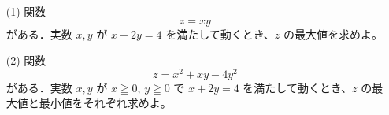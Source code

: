 \documentclass[8pt,dvipdfmx]{article}
\begin{document}
\begin{tcolorbox}[title=数学\textcircled{1} 1-5 BC]
\begin{enumerate}
    \item[(1)] 関数 \[ z = xy \] がある．実数 \(x, y\) が \(x + 2y = 4\) を満たして動くとき、\(z\) の最大値を求めよ。
    \vspace{2mm} %

    \item[(2)] 関数 \[ z = x^2 + xy - 4y^2 \] がある．実数 \(x, y\) が \(x \geqq 0\), \(y \geqq 0\) で \(x + 2y = 4\) を満たして動くとき、\(z\) の最大値と最小値をそれぞれ求めよ。
\end{enumerate}
\end{tcolorbox}

\end{document}

